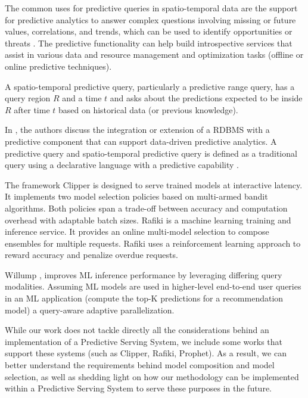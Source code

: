 The common uses for predictive queries in spatio-temporal data are the support for predictive analytics to answer complex questions involving missing or future values, correlations, and trends, which can be used to identify opportunities or threats \cite{}. The predictive functionality can help build introspective services that assist in various data and resource management and optimization tasks (offline or online predictive techniques).

A spatio-temporal predictive query, particularly a predictive range query, has a query region $R$ and a time $t$ and asks about the predictions expected to be inside $R$ after time $t$ based on historical data (or previous knowledge). 

In \cite{Akdere2011}, the authors discuss the integration or extension of a RDBMS with a predictive component that can support data-driven predictive analytics. A predictive query and spatio-temporal predictive query is defined as a traditional query using a declarative language with a predictive capability \cite{Hendawi2012}. 

The framework Clipper \cite{Crankshaw2017} is designed to serve trained models at interactive latency. It implements two model selection policies based on multi-armed bandit algorithms. Both policies span a trade-off between accuracy and computation overhead with adaptable batch sizes. Rafiki \cite{Wang2018} is a machine learning training and inference service. It provides an online multi-model selection to compose ensembles for multiple requests. Rafiki uses a reinforcement learning approach to reward accuracy and penalize overdue requests. 

Willump \cite{Kraft2019}, improves ML inference performance by leveraging differing query modalities. Assuming ML models are used in higher-level end-to-end user queries in an ML application (compute the top-K predictions for a recommendation model) a query-aware adaptive parallelization.

While our work does not tackle directly all the considerations behind an implementation of a Predictive Serving System, we include some works that support these systems (such as Clipper, Rafiki, Prophet). As a result, we can better understand the requirements behind model composition and model selection, as well as shedding light on how our methodology can be implemented within a Predictive Serving System to serve these purposes in the future.